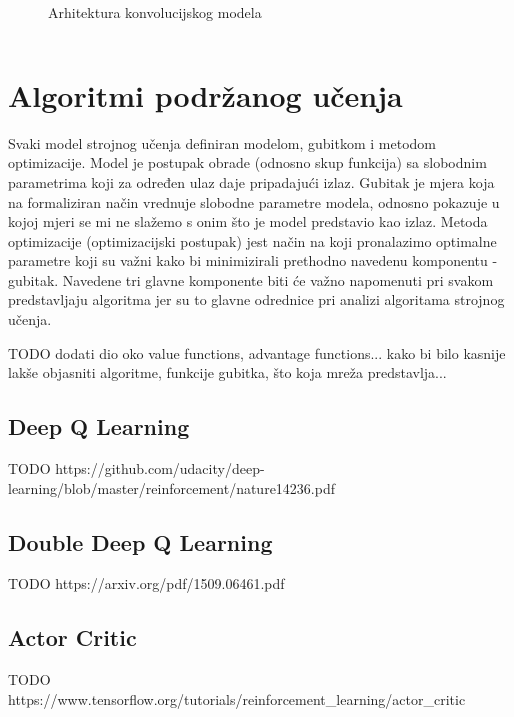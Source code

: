 \begin{figure}[H]
    \centering
    \caption{Arhitektura konvolucijskog modela}
    \label{fig:cnn}
\end{figure}

\begin{listing}[H]
    \caption{Implementacija konvolucijskog modela na slici \ref{fig:cnn} koristeći biblioteku \textit{PyTorch}}
    \inputminted{python}{snippets/cnn.py}
    \label{lst:cnn}
\end{listing}

\section{Algoritmi podržanog učenja}

Svaki model strojnog učenja definiran modelom, gubitkom i metodom optimizacije. Model je postupak obrade (odnosno skup funkcija) sa slobodnim parametrima koji za određen ulaz daje pripadajući izlaz. Gubitak je mjera koja na formaliziran način vrednuje slobodne parametre modela, odnosno pokazuje u kojoj mjeri se mi ne slažemo s onim što je model predstavio kao izlaz. Metoda optimizacije (optimizacijski postupak) jest način na koji pronalazimo optimalne parametre koji su važni kako bi minimizirali prethodno navedenu komponentu - gubitak. Navedene tri glavne komponente biti će važno napomenuti pri svakom predstavljaju algoritma jer su to glavne odrednice pri analizi algoritama strojnog učenja.

TODO dodati dio oko value functions, advantage functions... kako bi bilo kasnije lakše objasniti algoritme, funkcije gubitka, što koja mreža predstavlja...



\subsection{Deep Q Learning}

TODO https://github.com/udacity/deep-learning/blob/master/reinforcement/nature14236.pdf

\subsection{Double Deep Q Learning}

TODO https://arxiv.org/pdf/1509.06461.pdf

\subsection{Actor Critic}

TODO https://www.tensorflow.org/tutorials/reinforcement_learning/actor_critic

